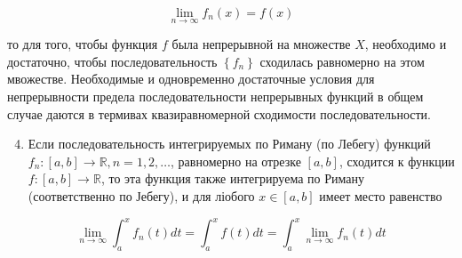 \documentclass[10pt]{article}
\begin{document}
\[

\lim _{n \rightarrow \infty} f_{n}(x)=f(x)

\]



то для того, чтобы функция $f$ была непрерывной на множестве $X$, необходимо и достаточно, чтобы последовательность $\left\{f_{n}\right\}$ сходилась равномерно на этом мвожестве. Необходимые и одновременно достаточные условия для непрерывности предела последовательности непрерывных функций в общем случае даются в термивах квазиравномерной сходимости последовательности.



\begin{enumerate}

  \setcounter{enumi}{3}

  \item Если последовательность интегрируемых по Риману (по Лебегу) функций $f_{n}:[a, b] \rightarrow \mathbb{R}, n=1,2, \ldots$, равномерно на отрезке $[a, b]$, сходится к функции $f:[a, b] \rightarrow \mathbb{R}$, то эта функция также интегрируема по Риману (соответственно по Јебегу), и для ліобого $x \in[a, b]$ имеет место равенство

\end{enumerate}



\[

\lim _{n \rightarrow \infty} \int_{a}^{x} f_{n}(t) d t=\int_{a}^{x} f(t) d t=\int_{a}^{x} \lim _{n \rightarrow \infty} f_{n}(t) d t

\]
\end{document}
